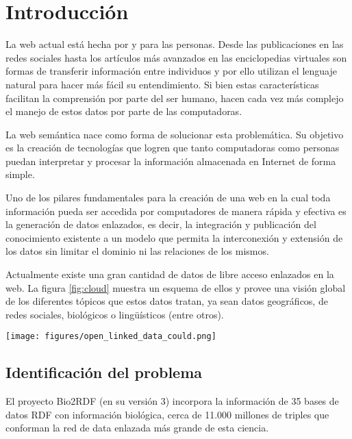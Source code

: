 
\chapter{Introducción}

La web actual está hecha por y para las personas. Desde las publicaciones en las
redes sociales hasta los artículos más avanzados en las enciclopedias virtuales
son formas de transferir información entre individuos y por ello utilizan el
lenguaje natural para hacer más fácil su entendimiento. Si bien estas
características facilitan la comprensión por parte del ser humano, hacen cada
vez más complejo el manejo de estos datos por parte de las computadoras.

La web semántica nace como forma de solucionar esta problemática. Su objetivo es
la creación de tecnologías que logren que tanto computadoras como personas
puedan interpretar y procesar la información almacenada en Internet
de forma simple.

Uno de los pilares fundamentales para la creación de una web en la cual toda
información pueda ser accedida por computadores de manera rápida y efectiva es
la generación de datos enlazados, es decir, la integración y publicación del 
conocimiento existente a un modelo que permita la interconexión y extensión de
los datos sin limitar el dominio ni las relaciones de los mismos.

Actualmente existe una gran cantidad de datos de libre acceso enlazados en la
web. La figura \ref{fig:cloud} muestra un esquema de ellos y provee una visión
global de los diferentes tópicos que estos datos tratan, ya sean datos
geográficos, de redes sociales, biológicos o lingüísticos (entre otros).

\begin{sidewaysfigure}
  \centering
  \texttt{[image: figures/open\_linked\_data\_could.png]}
  \caption{Conexiones entre las bases de datos abiertas hasta agosto del 2014.}
  \vspace{-.25cm}
  \caption*{Creado por Linked Open Data Cloud project\cite{lod:cloud}.}
  \label{fig:cloud}
\end{sidewaysfigure}

\section{Identificación del problema}

El proyecto Bio2RDF (en su versión 3) incorpora la información de 35 bases de
datos RDF con información biológica, cerca de 11.000 millones de triples que
conforman la red de data enlazada más grande de esta ciencia.

